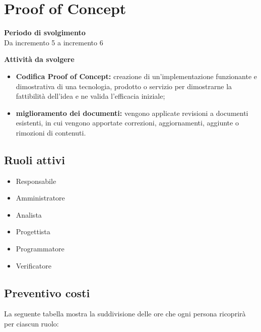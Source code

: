 \section{Proof of Concept}

\textbf{Periodo di svolgimento}
\\ Da incremento 5 a incremento 6

\textbf{Attività da svolgere}
    \begin{itemize}
        \item \textbf{Codifica Proof of Concept:} creazione di un'implementazione funzionante e dimostrativa di una tecnologia, prodotto o servizio per dimostrarne la fattibilità dell'idea e ne valida l'efficacia iniziale; 
        \item \textbf{miglioramento dei documenti:} vengono applicate revisioni a documenti esistenti, in cui vengono apportate correzioni, aggiornamenti, aggiunte o rimozioni di contenuti.
    \end{itemize}

\subsection{Ruoli attivi}
\begin{itemize}
    \item Responsabile 
    \item Amministratore 
    \item Analista 
    \item Progettista 
    \item Programmatore 
    \item Verificatore 
\end{itemize}

\subsection{Preventivo costi}

La seguente tabella mostra la suddivisione delle ore che ogni persona ricoprirà per ciascun ruolo:

